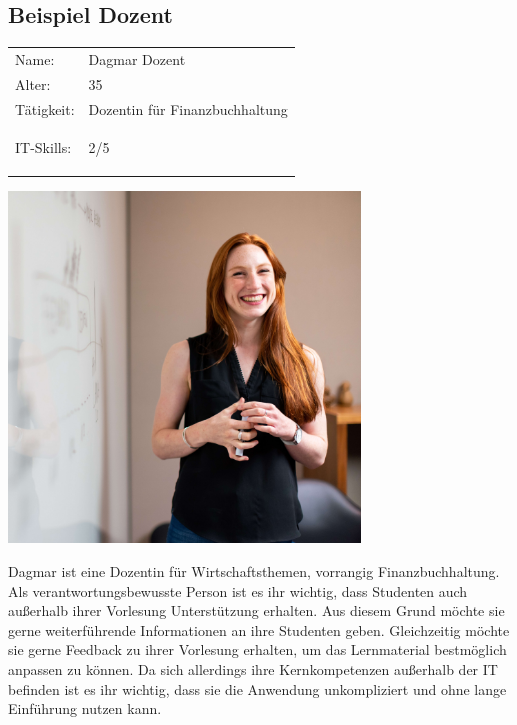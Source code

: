 \subsection{Beispiel Dozent}
\begin{minipage}[t]{0.5\textwidth}
	\vspace{-4cm}
	\renewcommand{\arraystretch}{1.5}
	\begin{tabular}{l l}
		Name: & Dagmar Dozent \\
		Alter: & 35 \\
		Tätigkeit: & Dozentin für Finanzbuchhaltung \\
		IT-Skills: & 2/5 \hspace{-1cm} \begin{barchart}{5.0}
			\baritemNL{}{2}
		\end{barchart} \\
	\end{tabular}
\end{minipage}
\hfill
\begin{minipage}[t]{0.4\textwidth}
	\flushright
	\includegraphics[width=0.70\textwidth]{img/thisisengineering-raeng-TXxiFuQLBKQ-unsplash.jpg}
\end{minipage}

Dagmar ist eine Dozentin für Wirtschaftsthemen, vorrangig Finanzbuchhaltung.
Als verantwortungsbewusste Person ist es ihr wichtig, dass Studenten auch außerhalb ihrer Vorlesung Unterstützung erhalten.
Aus diesem Grund möchte sie gerne weiterführende Informationen an ihre Studenten geben.
Gleichzeitig möchte sie gerne Feedback zu ihrer Vorlesung erhalten, um das Lernmaterial bestmöglich anpassen zu können.
Da sich allerdings ihre Kernkompetenzen außerhalb der IT befinden ist es ihr wichtig, dass sie die Anwendung unkompliziert und ohne lange Einführung nutzen kann. 


